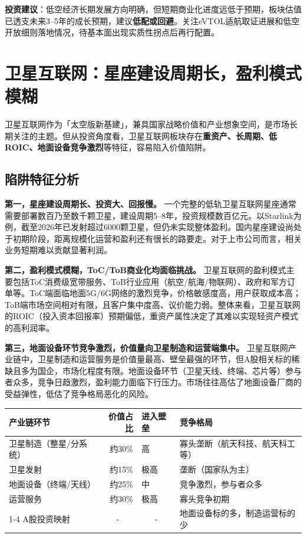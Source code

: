 \textbf{投资建议}：低空经济长期发展方向明确，但短期商业化进度远低于预期，板块估值已透支未来3--5年的成长预期，建议\textbf{低配或回避}。关注eVTOL适航取证进展和低空开放细则落地情况，待基本面出现实质性拐点后再行配置。

\section{卫星互联网：星座建设周期长，盈利模式模糊}

卫星互联网作为「太空版新基建」，兼具国家战略价值和产业想象空间，是市场长期关注的主题。但从投资角度看，卫星互联网板块存在\textbf{重资产、长周期、低ROIC、地面设备竞争激烈}等特征，容易陷入价值陷阱。

\subsection{陷阱特征分析}

\textbf{第一，星座建设周期长、投资大、回报慢。} 一个完整的低轨卫星互联网星座通常需要部署数百乃至数千颗卫星，建设周期5--8年，投资规模数百亿元。以Starlink为例，截至2026年已发射超过6000颗卫星，但仍未实现整体盈利。国内星座建设尚处于初期阶段，距离规模化运营和盈利还有很长的路要走。对于上市公司而言，相关业务短期难以贡献显著利润。

\textbf{第二，盈利模式模糊，ToC/ToB商业化均面临挑战。} 卫星互联网的盈利模式主要包括ToC消费级宽带服务、ToB行业应用（航空/航海/物联网）、政府和军方订单等。ToC端面临地面5G/6G网络的激烈竞争，价格敏感度高，用户获取成本高；ToB端市场空间相对有限，且客户集中度高、议价能力弱。整体来看，卫星互联网的ROIC（投入资本回报率）预期偏低，重资产属性决定了其难以实现轻资产模式的高利润率。

\textbf{第三，地面设备环节竞争激烈，价值量向卫星制造和运营端集中。} 卫星互联网产业链中，卫星制造和运营服务是价值量最高、壁垒最强的环节，但A股相关标的稀缺且多为国企，市场化程度有限。地面设备环节（卫星天线、终端、芯片等）参与者众多，竞争日趋激烈，盈利能力面临下行压力。市场往往高估了地面设备厂商的受益弹性，低估了竞争格局恶化的风险。

\begin{exhibitbox}[表 7-3：卫星互联网产业链价值分布与竞争格局]
\label{tab:satellite-value-chain}
\centering
\small
\begin{tabularx}{\textwidth}{X r l l}
\toprule
\textbf{产业链环节} & \textbf{价值占比} & \textbf{进入壁垒} & \textbf{竞争格局} \\
\midrule
卫星制造（整星/分系统） & 约30\% & 高 & 寡头垄断（航天科技、航天科工等） \\
卫星发射 & 约15\% & 极高 & 垄断（国家队为主） \\
地面设备（终端/天线） & 约25\% & 中 & 竞争激烈，参与者众多 \\
运营服务 & 约30\% & 极高 & 寡头竞争初期 \\
\cmidrule(lr){1-4}
A股投资映射 & \multicolumn{1}{c}{-} & \multicolumn{1}{c}{-} & 地面设备标的多，制造运营标的少 \\
\bottomrule
\end{tabularx}
\end{exhibitbox}

